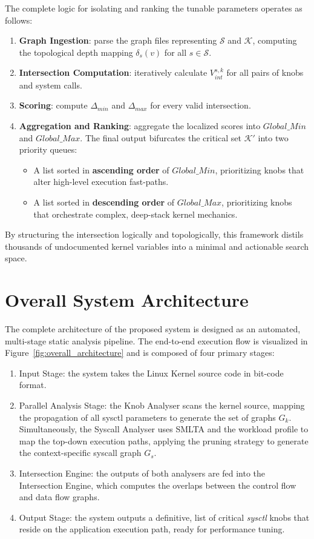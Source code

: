 The complete logic for isolating and ranking the tunable parameters operates as follows:
\begin{enumerate}
    \item \textbf{Graph Ingestion}: parse the graph files representing $\mathcal{S}$ and $\mathcal{K}$, computing the topological depth mapping $\delta_s(v)$ for all $s \in \mathcal{S}$.
    \item \textbf{Intersection Computation}: iteratively calculate $V_{int}^{s,k}$ for all pairs of knobs and system calls.
    \item \textbf{Scoring}: compute $\Delta_{min}$ and $\Delta_{max}$ for every valid intersection.
    \item \textbf{Aggregation and Ranking}: aggregate the localized scores into $Global\_Min$ and $Global\_Max$. The final output bifurcates the critical set $\mathcal{K}'$ into two priority queues:
    \begin{itemize}
        \item A list sorted in \textbf{ascending order} of $Global\_Min$, prioritizing knobs that alter high-level execution fast-paths.
        \item A list sorted in \textbf{descending order} of $Global\_Max$, prioritizing knobs that orchestrate complex, deep-stack kernel mechanics.
    \end{itemize}
\end{enumerate}

By structuring the intersection logically and topologically, this framework distils thousands of undocumented kernel variables into a minimal and actionable search space.

\section{Overall System Architecture}
\label{sec:system_architecture}

The complete architecture of the proposed system is designed as an automated, multi-stage static analysis pipeline.
The end-to-end execution flow is visualized in Figure~\ref{fig:overall_architecture} and is composed of four primary stages:
\begin{enumerate}
    \item Input Stage: the system takes the Linux Kernel source code in bit-code format.
    \item Parallel Analysis Stage: the Knob Analyser scans the kernel source, mapping the propagation of all sysctl parameters to generate the set of graphs $G_k$. Simultaneously, the Syscall Analyser uses SMLTA and the workload profile to map the top-down execution paths, applying the pruning strategy to generate the context-specific syscall graph $G_s$.
    \item Intersection Engine: the outputs of both analysers are fed into the Intersection Engine, which computes the overlaps between the control flow and data flow graphs.
    \item Output Stage: the system outputs a definitive, list of critical \textit{sysctl} knobs that reside on the application execution path, ready for performance tuning.
\end{enumerate}

